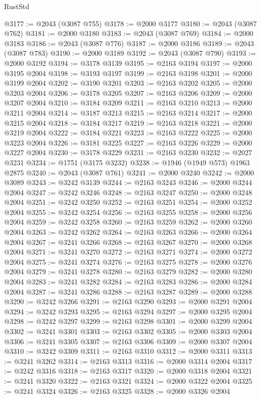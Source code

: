 \begin{lexlean}{RustStd}
\begin{coremodule}
{\begin{coremodule}
{{{{{{{{{{{{{{{{{{{{{{{{{{{{{{{@3177 := @2043 (@3087 @755)
@3178 := @2000 @3177
@3180 := @2043 (@3087 @762)
@3181 := @2000 @3180
@3183 := @2043 (@3087 @769)
@3184 := @2000 @3183
@3186 := @2043 (@3087 @776)
@3187 := @2000 @3186
@3189 := @2043 (@3087 @783)
@3190 := @2000 @3189
@3192 := @2043 (@3087 @790)
@3193 := @2000 @3192
@3194 := @3178 @3139
@3195 := @2163 @3194
@3197 := @2000 @3195 @2004
@3198 := @3193 @3197
@3199 := @2163 @3198
@3201 := @2000 @3199 @2004
@3202 := @3190 @3201
@3203 := @2163 @3202
@3205 := @2000 @3203 @2004
@3206 := @3178 @3205
@3207 := @2163 @3206
@3209 := @2000 @3207 @2004
@3210 := @3184 @3209
@3211 := @2163 @3210
@3213 := @2000 @3211 @2004
@3214 := @3187 @3213
@3215 := @2163 @3214
@3217 := @2000 @3215 @2004
@3218 := @3184 @3217
@3219 := @2163 @3218
@3221 := @2000 @3219 @2004
@3222 := @3184 @3221
@3223 := @2163 @3222
@3225 := @2000 @3223 @2004
@3226 := @3181 @3225
@3227 := @2163 @3226
@3229 := @2000 @3227 @2004
@3230 := @3178 @3229
@3231 := @2163 @3230
@3232 := @2027 @3231
@3234 := @1751 (@3175 @3232)
@3238 := @1946 (@1949 @573) @1963 @2875
@3240 := @2043 (@3087 @761)
@3241 := @2000 @3240
@3242 := @2000 @3089
@3243 := @3242 @3139
@3244 := @2163 @3243
@3246 := @2000 @3244 @2004
@3247 := @3242 @3246
@3248 := @2163 @3247
@3250 := @2000 @3248 @2004
@3251 := @3242 @3250
@3252 := @2163 @3251
@3254 := @2000 @3252 @2004
@3255 := @3242 @3254
@3256 := @2163 @3255
@3258 := @2000 @3256 @2004
@3259 := @3242 @3258
@3260 := @2163 @3259
@3262 := @2000 @3260 @2004
@3263 := @3242 @3262
@3264 := @2163 @3263
@3266 := @2000 @3264 @2004
@3267 := @3241 @3266
@3268 := @2163 @3267
@3270 := @2000 @3268 @2004
@3271 := @3241 @3270
@3272 := @2163 @3271
@3274 := @2000 @3272 @2004
@3275 := @3241 @3274
@3276 := @2163 @3275
@3278 := @2000 @3276 @2004
@3279 := @3241 @3278
@3280 := @2163 @3279
@3282 := @2000 @3280 @2004
@3283 := @3241 @3282
@3284 := @2163 @3283
@3286 := @2000 @3284 @2004
@3287 := @3241 @3286
@3288 := @2163 @3287
@3289 := @2000 @3288
@3290 := @3242 @3266
@3291 := @2163 @3290
@3293 := @2000 @3291 @2004
@3294 := @3242 @3293
@3295 := @2163 @3294
@3297 := @2000 @3295 @2004
@3298 := @3242 @3297
@3299 := @2163 @3298
@3301 := @2000 @3299 @2004
@3302 := @3241 @3301
@3303 := @2163 @3302
@3305 := @2000 @3303 @2004
@3306 := @3241 @3305
@3307 := @2163 @3306
@3309 := @2000 @3307 @2004
@3310 := @3242 @3309
@3311 := @2163 @3310
@3312 := @2000 @3311
@3313 := @3241 @3262
@3314 := @2163 @3313
@3316 := @2000 @3314 @2004
@3317 := @3242 @3316
@3318 := @2163 @3317
@3320 := @2000 @3318 @2004
@3321 := @3241 @3320
@3322 := @2163 @3321
@3324 := @2000 @3322 @2004
@3325 := @3241 @3324
@3326 := @2163 @3325
@3328 := @2000 @3326 @2004
}}}}}}}}}}}}}}}}}}}}}}}}}}}}}}}
\end{coremodule}}
\end{coremodule}
\end{lexlean}
